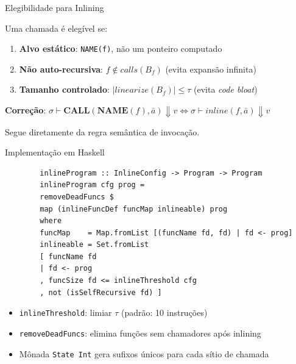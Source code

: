 \begin{frame}[fragile]{Elegibilidade para Inlining}

    Uma chamada é elegível se:

    \begin{enumerate}

        \item
        \textbf{Alvo estático}: \texttt{NAME(f)}, não um
        ponteiro computado
        \item
        \textbf{Não auto-recursiva}: \(f \notin \mathit{calls}(B_f)\) (evita
        expansão infinita)
        \item
        \textbf{Tamanho controlado}: \(|\mathit{linearize}(B_f)| \leq \tau\)
        (evita \emph{code bloat})
    \end{enumerate}

    \textbf{Correção}:
    \(\sigma \vdash \mathbf{CALL}(\mathbf{NAME}(f), \bar{a}) \Downarrow v \iff \sigma \vdash \mathit{inline}(f, \bar{a}) \Downarrow v\)

    Segue diretamente da regra semântica de invocação.
\end{frame}

\begin{frame}[fragile]{Implementação em Haskell}

    \begin{lstlisting}
        inlineProgram :: InlineConfig -> Program -> Program
        inlineProgram cfg prog =
        removeDeadFuncs $
        map (inlineFuncDef funcMap inlineable) prog
        where
        funcMap    = Map.fromList [(funcName fd, fd) | fd <- prog]
        inlineable = Set.fromList
        [ funcName fd
        | fd <- prog
        , funcSize fd <= inlineThreshold cfg
        , not (isSelfRecursive fd) ]
    \end{lstlisting}

    \begin{itemize}

        \item
        \texttt{inlineThreshold}: limiar \(\tau\) (padrão: 10
        instruções)
        \item
        \texttt{removeDeadFuncs}: elimina funções sem
        chamadores após inlining
        \item
        Mônada \texttt{State Int} gera sufixos únicos para
        cada sítio de chamada
    \end{itemize}
\end{frame}

